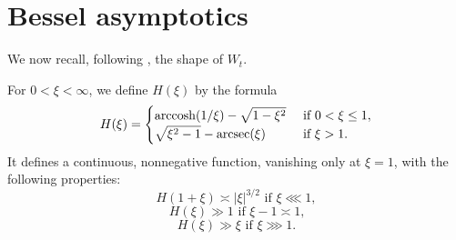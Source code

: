 \documentclass[reqno]{amsart} 
\begin{document}
\section{Bessel asymptotics}\label{sec:cqx50az4ip}
We now recall, following \cite[p 1527-1528]{MR3102912}, the shape of $W_t$.


For $0 < \xi < \infty$, we define $H(\xi)$ by the formula
\begin{equation*}
  H(\xi) =
  \begin{cases}
    {\operatorname{arccosh}} {\left(1/ \xi\right)}   - \sqrt{1 - \xi ^2 }  &  \text{ if } 0 < \xi \leq 1, \\
    \sqrt{\xi ^2 - 1} - {\operatorname{arcsec}} {\left(\xi\right)}                                               & \text{ if } \xi > 1.
  \end{cases}
\end{equation*}
It defines a continuous, nonnegative function, vanishing only at $\xi = 1$, with the following properties:
\begin{equation}\label{equation:H-near-critical}
  \text{$H(1 + \xi) \asymp |\xi|^{3/2}$ if $\xi \lll 1$},
\end{equation}
\begin{equation}\label{equation:H-in-bulk}
  \text{$H(\xi) \gg 1$ if $\xi - 1 \asymp 1$,}
\end{equation}
\begin{equation}\label{eqn:growth-of-H-at-infinity}
  \text{$H(\xi) \gg \xi$ if $\xi \ggg 1$.}
\end{equation}
\end{document}
